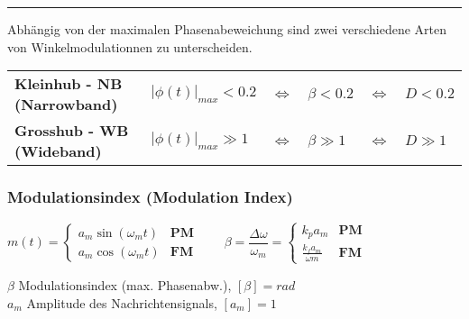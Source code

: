 \hrule
{}
Abhängig von der maximalen Phasenabeweichung sind zwei verschiedene Arten von Winkelmodulationnen zu
unterscheiden. \\

\begin{tabular}{llll}
\textbf{Kleinhub - NB (Narrowband)} 
	& $|\phi(t)|_{max} < 0.2$ 
	& $\Leftrightarrow \quad \beta < 0.2$
	& $\Leftrightarrow \quad D < 0.2$ \\

\textbf{Grosshub - WB (Wideband)}
 & $|\phi(t)|_{max} \gg 1$
 & $\Leftrightarrow \quad \beta \gg 1$
 & $\Leftrightarrow \quad D \gg 1$ \\

\end{tabular}
 



\subsubsection{Modulationsindex (Modulation Index)}
\begin{minipage}[t][0.7cm][c]{10cm}

$ m(t) = \begin{cases}
          	a_m \sin(\omega_m t)  & \textbf{PM}\\
          	a_m \cos(\omega_m t)  & \textbf{FM}
          \end{cases}  
\qquad
\beta = \dfrac{\Delta \omega}{\omega_m} =
\begin{cases}
	k_p a_m & \textbf{PM}  \\
	\frac{k_f a_m}{\omega m} & \textbf{FM}
\end{cases} 
$
\end{minipage}
\begin{minipage}[t][0.7cm][c]{8cm}
	$\beta$ Modulationsindex (max. Phasenabw.), $[\beta] = rad$ \\
	$a_m$ Amplitude des Nachrichtensignals, $[a_m] = 1$ %
\end{minipage}

